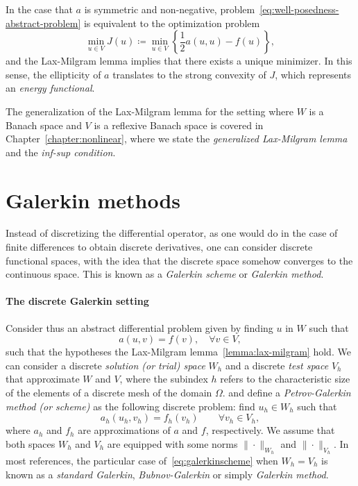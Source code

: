 In the case that $a$ is symmetric and non-negative, problem~\ref{eq:well-posedness-abstract-problem} is equivalent to the optimization problem 
\begin{equation*}
    \min_{u\in V} J(u) \coloneqq \min_{u\in V} \left\{\frac{1}{2}a(u,u) - f(u)\right\},
\end{equation*}
and the Lax-Milgram lemma implies that there exists a unique minimizer. In this sense, the ellipticity of $a$ translates to the strong convexity of $J$, which represents an \emph{energy functional}. 

The generalization of the Lax-Milgram lemma for the setting where $W$ is a Banach space and $V$ is a reflexive Banach space is covered in Chapter~\ref{chapter:nonlinear}, where we state the \emph{generalized Lax-Milgram lemma} and the \emph{inf-sup condition}. 

\section{Galerkin methods}\label{sec:galerkin}
Instead of discretizing the differential operator, as one would do in the case of finite differences to obtain discrete derivatives, one can consider discrete functional spaces, with the idea that the discrete space somehow converges to the continuous space. This is known as a \emph{Galerkin scheme} or \emph{Galerkin method}.

\paragraph{The discrete Galerkin setting}
Consider thus an abstract differential problem given by finding $u$ in $W$ such that
\begin{equation}
    a(u, v) = f(v), \quad \forall v \in V,
\end{equation}
such that the hypotheses the Lax-Milgram lemma~\ref{lemma:lax-milgram} hold. We can consider a discrete \emph{solution (or trial) space} $W_h$ and a discrete \emph{test space} $V_h$ that approximate $W$ and $V$, where the subindex $h$ refers to the characteristic size of the elements of a discrete mesh of the domain $\Omega$. and define a \emph{Petrov-Galerkin method (or scheme)} as the following discrete problem: find $u_h \in W_h$ such that 
\begin{equation}\label{eq:galerkinscheme}
    a_h(u_h, v_h) = f_h(v_h) \qquad \forall v_h \in V_h,
\end{equation}
where $a_h$ and $f_h$ are approximations of $a$ and $f$, respectively. 
We assume that both spaces $W_h$ and $V_h$ are equipped with some norms $\|\cdot\|_{W_h}$ and $\|\cdot\|_{V_h}$. In most references, the particular case of~\ref{eq:galerkinscheme} when $W_h = V_h$ is known as a \emph{standard Galerkin}, \emph{Bubnov-Galerkin} or simply \emph{Galerkin method}. 

